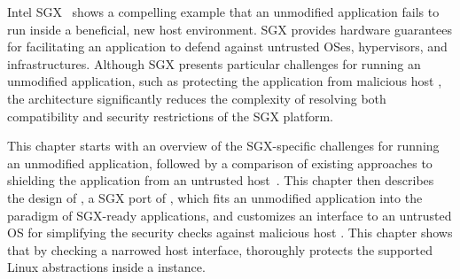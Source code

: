 Intel SGX~\cite{intelsgx} shows a compelling example that an unmodified application fails to run inside a beneficial, new host environment.
SGX provides hardware guarantees
for facilitating an application to defend against untrusted OSes, hypervisors, and infrastructures.
Although SGX presents particular challenges for running an unmodified application, such as protecting the application
from malicious host \linuxapis{},
the \graphene{} architecture significantly reduces the complexity
of resolving both compatibility and security restrictions of the SGX platform.


This chapter starts with an overview of the SGX-specific challenges
for running an unmodified application,
followed by a comparison of existing approaches to shielding the application from an untrusted host~\cite{osdi16scone,shinde17panoply,baumann14haven}.
This chapter then describes the design of \graphenesgx{},
a SGX port of \graphene{},
which fits an unmodified application into the paradigm of SGX-ready applications,
and customizes an interface to an untrusted OS
for simplifying the security checks against malicious host \linuxapis{}.
This chapter shows
that by checking a narrowed host interface,
\graphene{} thoroughly protects the supported Linux abstractions inside a \thelibos{} instance.
